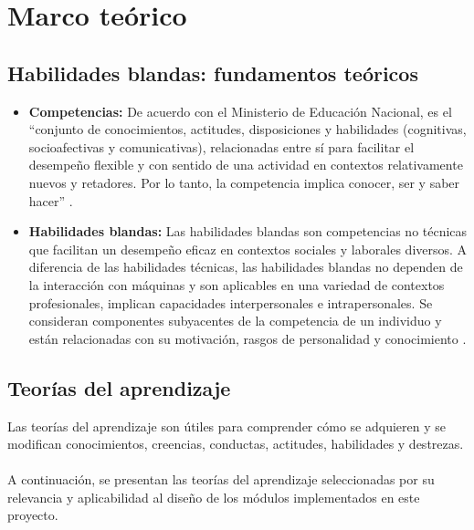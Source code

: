 \section{Marco teórico}

\subsection{Habilidades blandas: fundamentos teóricos}

\begin{itemize}
    \item \textbf{Competencias:} De acuerdo con el Ministerio de Educación Nacional, es el “conjunto de conocimientos, actitudes, disposiciones y habilidades (cognitivas, socioafectivas y comunicativas), relacionadas entre sí para facilitar el desempeño flexible y con sentido de una actividad en contextos relativamente nuevos y retadores. Por lo tanto, la competencia implica conocer, ser y saber hacer” \cite{Ministerio2024}.
    
    \item \textbf{Habilidades blandas:} Las habilidades blandas son competencias no técnicas que facilitan un desempeño eficaz en contextos sociales y laborales diversos. A diferencia de las habilidades técnicas, las habilidades blandas no dependen de la interacción con máquinas y son aplicables en una variedad de contextos profesionales, implican capacidades interpersonales e intrapersonales. Se consideran componentes subyacentes de la competencia de un individuo y están relacionadas con su motivación, rasgos de personalidad y conocimiento \cite{Marin-Zapata2022}.
\end{itemize}

\subsection{Teorías del aprendizaje}
Las teorías del aprendizaje son útiles para comprender cómo se adquieren y se modifican conocimientos, creencias, conductas, actitudes, habilidades y destrezas. 
\\
\\
A continuación, se presentan las teorías del aprendizaje seleccionadas por su relevancia y aplicabilidad al diseño de los módulos implementados en este proyecto.

